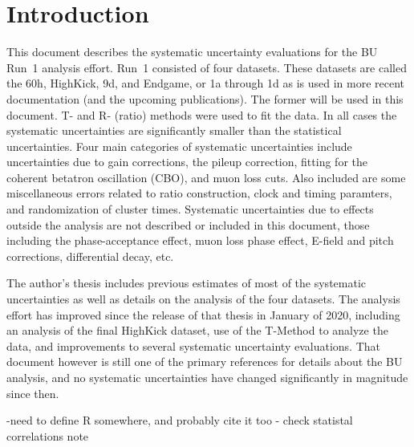 
\graphicspath{}

\section{Introduction}


This document describes the systematic uncertainty evaluations for the BU Run~1 \wa analysis effort. Run~1 consisted of four datasets. These datasets are called the 60h, HighKick, 9d, and Endgame, or 1a through 1d as is used in more recent documentation (and the upcoming publications). The former will be used in this document. T- and R- (ratio) methods were used to fit the data. In all cases the systematic uncertainties are significantly smaller than the statistical uncertainties. Four main categories of systematic uncertainties include uncertainties due to gain corrections, the pileup correction, fitting for the coherent betatron oscillation (CBO), and muon loss cuts. Also included are some miscellaneous errors related to ratio construction, clock and timing paramters, and randomization of cluster times. Systematic uncertainties due to effects outside the \wa analysis are not described or included in this document, those including the phase-acceptance effect, muon loss phase effect, E-field and pitch corrections, differential decay, etc.

The author's thesis \cite{phdthesis:2020Kinnaird} includes previous estimates of most of the systematic uncertainties as well as details on the analysis of the four datasets. The analysis effort has improved since the release of that thesis in January of 2020, including an analysis of the final HighKick dataset, use of the T-Method to analyze the data, and improvements to several systematic uncertainty evaluations. That document however is still one of the primary references for details about the BU \wa analysis, and no systematic uncertainties have changed significantly in magnitude since then.



-need to define R somewhere, and probably cite it too - check statistal correlations note







